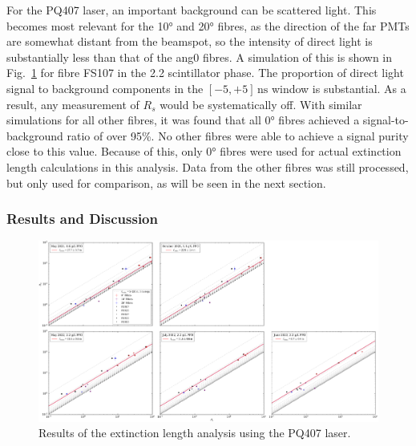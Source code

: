 For the PQ407 laser, an important background can be scattered light. This becomes most relevant for the \ang{10} and \ang{20} fibres, as the direction of the far PMTs are somewhat distant from the beamspot, so the intensity of direct light is substantially less than that of the ang{0} fibres. A simulation of this is shown in Fig.~\ref{fig:smellie_PQ407_FS107_far_pmts_components} for fibre FS107 in the \SI{2.2}{\gpl} scintillator phase. The proportion of direct light signal to background components in the $[-5,+5]\,\si{\ns}$ window is substantial. As a result, any measurement of $R_{s}$ would be systematically off. %
With similar simulations for all other fibres, it was found that all \ang{0} fibres achieved a signal-to-background ratio of over 95\%. No other fibres were able to achieve a signal purity close to this value. Because of this, only \ang{0} fibres were used for actual extinction length calculations in this analysis. Data from the other fibres was still processed, but only used for comparison, as will be seen in the next section.

\begin{figure}
    \centering
    \caption[]{}
    \label{fig:smellie_PQ407_FS107_far_pmts_components}
\end{figure}

\subsubsection{Results and Discussion}

\begin{figure}
    \centering
    \includegraphics[width=\textwidth]{5_SMELLIEAnalysis/images/rsrw_plot_combined_PQ405.pdf}
    \caption[Results of the extinction length analysis using the PQ407 laser]
    {Results of the extinction length analysis using the PQ407 laser.}
\end{figure}



